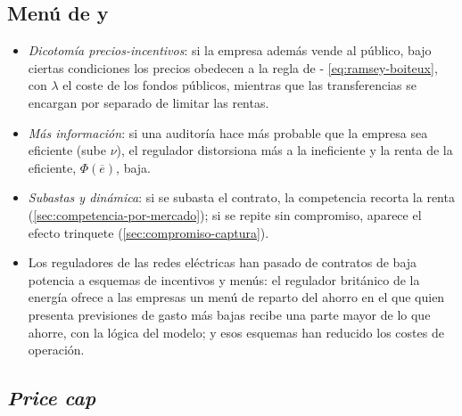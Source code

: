 \documentclass[11pt]{article}
\begin{document}
\subsection{Menú de  y }\label{anexo:extensiones-lt}

\begin{itemize}
\item \emph{Dicotomía precios-incentivos}: si la empresa además vende al público, bajo ciertas condiciones los precios obedecen a la regla de - \eqref{eq:ramsey-boiteux}, con $\lambda$ el coste de los fondos públicos, mientras que las transferencias se encargan por separado de limitar las rentas\nocite{LaffontTirole1993Theory}.
\item \emph{Más información}: si una auditoría hace más probable que la empresa sea eficiente (sube $\nu$), el regulador distorsiona más a la ineficiente y la renta de la eficiente, $\Phi(\overline{e})$, baja.
\item \emph{Subastas y dinámica}: si se subasta el contrato, la competencia recorta la renta (\ref{sec:competencia-por-mercado}); si se repite sin compromiso, aparece el efecto trinquete (\ref{sec:compromiso-captura}).
\item Los reguladores de las redes eléctricas han pasado de contratos de baja potencia a esquemas de incentivos y menús: el regulador británico de la energía ofrece a las empresas un menú de reparto del ahorro en el que quien presenta previsiones de gasto más bajas recibe una parte mayor de lo que ahorre, con la lógica del modelo; y esos esquemas han reducido los costes de operación\nocite{Joskow2014Incentive}.
\end{itemize}

\subsection{\emph{Price cap}}\label{anexo:extensiones-pc}
\end{document}
